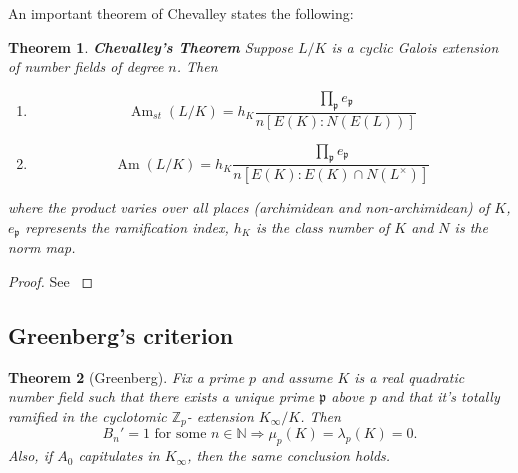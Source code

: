 \documentclass{article}
\numberwithin{equation}{section}
\theoremstyle{plain}  %
\newtheorem{theorem}{Theorem}[section]
\theoremstyle{definition}
\newcommand{\N}{\mathbb{N}}
\newcommand{\Z}{\mathbb{Z}}
\DeclareMathOperator{\Am}{Am}
\newcommand{\Amst}{\Am_{st}}
\newcommand{\mfp}{\mathfrak p}
\newcommand{\fk}{\mathfrak }
\begin{document}
An important theorem of Chevalley states the following: 

\begin{theorem}{\textbf{Chevalley's Theorem}} \label{th: Chevalley}
Suppose $L/K$ is a cyclic Galois extension of number fields of degree $n$. Then \begin{enumerate}[(1)]
\item $$\Amst(L/K)=h_K \frac{\prod\limits_\fk p e_\fk p}{n [E(K):N(E(L))] }$$
\item $$\Am(L/K)=h_K \frac{\prod\limits_\fk p e_\fk p}{n [E(K):E(K)\cap N(L^\times)] }$$
\end{enumerate}
    where the product varies over all places (archimidean and non-archimidean) of $K$, $e_\fk p$ represents the ramification index, $h_K$ is the class number of $K$ and $N$ is the norm map.
\end{theorem}
\begin{proof}
    See \cite{lang2012cyclotomic}
\end{proof}

\subsection{Greenberg's criterion}

\begin{theorem}[Greenberg] \label{th: Greenberg split}
    Fix a prime $p$ and assume $K$ is a real quadratic number field such that there exists a unique prime $\mfp$ above p and that it's totally ramified in the cyclotomic $\Z_p$- extension $K_\infty/K$. Then 
    $$ B_n'=1 \text{ for some } n \in \N \Rightarrow \mu_p(K)=\lambda_p(K)=0.$$ 
    Also, if $A_0$ capitulates in $K_\infty$, then the same conclusion holds. 
\end{theorem}
\end{document}
